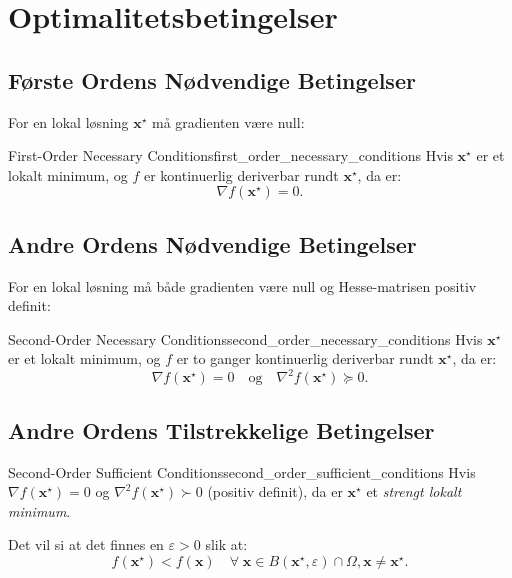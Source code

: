 


\chapter{Optimalitetsbetingelser}
\label{chap:optimality_conditions}
\section{Første Ordens Nødvendige Betingelser}

For en lokal løsning \(\mathbf{x}^\star\) må gradienten være null:

\begin{theorem}{First-Order Necessary Conditions}{first_order_necessary_conditions}
	Hvis \(\mathbf{x}^\star\) er et lokalt minimum, og \(f\) er kontinuerlig deriverbar rundt \(\mathbf{x}^\star\), da er:
	\[
		\nabla f(\mathbf{x}^\star) = 0.
	\]
\end{theorem}

\section{Andre Ordens Nødvendige Betingelser}

For en lokal løsning må både gradienten være null og Hesse-matrisen positiv definit:

\begin{theorem}{Second-Order Necessary Conditions}{second_order_necessary_conditions}
	Hvis \(\mathbf{x}^\star\) er et lokalt minimum, og \(f\) er to ganger kontinuerlig deriverbar rundt \(\mathbf{x}^\star\), da er:
	\[
		\nabla f(\mathbf{x}^\star) = 0 \quad \text{og} \quad \nabla^2 f(\mathbf{x}^\star) \succeq 0.
	\]
\end{theorem}

\section{Andre Ordens Tilstrekkelige Betingelser}

\begin{theorem}{Second-Order Sufficient Conditions}{second_order_sufficient_conditions}
	Hvis \(\nabla f(\mathbf{x}^\star) = 0\) og \(\nabla^2 f(\mathbf{x}^\star) \succ 0\) (positiv definit), da er \(\mathbf{x}^\star\) et \emph{strengt lokalt minimum}.

	\medskip

	Det vil si at det finnes en \(\varepsilon > 0\) slik at:
	\[
		f(\mathbf{x}^\star) < f(\mathbf{x})  \quad \forall \; \mathbf{x} \in B(\mathbf{x}^\star, \varepsilon) \cap \Omega, \mathbf{x} \neq \mathbf{x}^\star.
	\]
\end{theorem}

